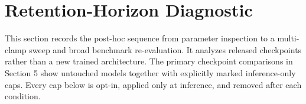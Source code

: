 \begin{table}[!ht]
\centering
\small
\setlength{\tabcolsep}{4pt}
\caption{Recorded systems-scale throughput for ATMA's 9.2B stress shape and vLLM 0.25.0 serving Qwen3.5-9B on one L40S (BF16, greedy sampling). Ratio is ATMA/vLLM.}
\label{table:vllm_comparison_matrix}
\end{table}

\section{Retention-Horizon Diagnostic}
\label{appendix:retention_audit}

This section records the post-hoc sequence from parameter inspection to a multi-clamp sweep and broad benchmark re-evaluation. It analyzes released checkpoints rather than a new trained architecture. The primary checkpoint comparisons in Section 5 show untouched models together with explicitly marked inference-only caps. Every cap below is opt-in, applied only at inference, and removed after each condition.

